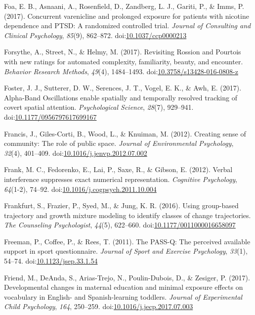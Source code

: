 \documentclass[english,man]{apa6}
\theoremstyle{definition}
\theoremstyle{definition}
\theoremstyle{definition}
\theoremstyle{remark}
\begin{document}
\hypertarget{ref-Foa2017a}{}
Foa, E. B., Asnaani, A., Rosenfield, D., Zandberg, L. J., Gariti, P., \&
Imms, P. (2017). Concurrent varenicline and prolonged exposure for
patients with nicotine dependence and PTSD: A randomized controlled
trial. \emph{Journal of Consulting and Clinical Psychology},
\emph{85}(9), 862--872.
doi:\href{https://doi.org/10.1037/ccp0000213}{10.1037/ccp0000213}

\hypertarget{ref-Forsythe2016}{}
Forsythe, A., Street, N., \& Helmy, M. (2017). Revisiting Rossion and
Pourtois with new ratings for automated complexity, familiarity, beauty,
and encounter. \emph{Behavior Research Methods}, \emph{49}(4),
1484--1493.
doi:\href{https://doi.org/10.3758/s13428-016-0808-z}{10.3758/s13428-016-0808-z}

\hypertarget{ref-Foster2017}{}
Foster, J. J., Sutterer, D. W., Serences, J. T., Vogel, E. K., \& Awh,
E. (2017). Alpha-Band Oscillations enable spatially and temporally
resolved tracking of covert spatial attention. \emph{Psychological
Science}, \emph{28}(7), 929--941.
doi:\href{https://doi.org/10.1177/0956797617699167}{10.1177/0956797617699167}

\hypertarget{ref-Francis2012}{}
Francis, J., Giles-Corti, B., Wood, L., \& Knuiman, M. (2012). Creating
sense of community: The role of public space. \emph{Journal of
Environmental Psychology}, \emph{32}(4), 401--409.
doi:\href{https://doi.org/10.1016/j.jenvp.2012.07.002}{10.1016/j.jenvp.2012.07.002}

\hypertarget{ref-Frank2012}{}
Frank, M. C., Fedorenko, E., Lai, P., Saxe, R., \& Gibson, E. (2012).
Verbal interference suppresses exact numerical representation.
\emph{Cognitive Psychology}, \emph{64}(1-2), 74--92.
doi:\href{https://doi.org/10.1016/j.cogpsych.2011.10.004}{10.1016/j.cogpsych.2011.10.004}

\hypertarget{ref-Frankfurt2016}{}
Frankfurt, S., Frazier, P., Syed, M., \& Jung, K. R. (2016). Using
group-based trajectory and growth mixture modeling to identify classes
of change trajectories. \emph{The Counseling Psychologist},
\emph{44}(5), 622--660.
doi:\href{https://doi.org/10.1177/0011000016658097}{10.1177/0011000016658097}

\hypertarget{ref-Freeman2011}{}
Freeman, P., Coffee, P., \& Rees, T. (2011). The PASS-Q: The perceived
available support in sport questionnaire. \emph{Journal of Sport and
Exercise Psychology}, \emph{33}(1), 54--74.
doi:\href{https://doi.org/10.1123/jsep.33.1.54}{10.1123/jsep.33.1.54}

\hypertarget{ref-Friend2017}{}
Friend, M., DeAnda, S., Arias-Trejo, N., Poulin-Dubois, D., \& Zesiger,
P. (2017). Developmental changes in maternal education and minimal
exposure effects on vocabulary in English- and Spanish-learning
toddlers. \emph{Journal of Experimental Child Psychology}, \emph{164},
250--259.
doi:\href{https://doi.org/10.1016/j.jecp.2017.07.003}{10.1016/j.jecp.2017.07.003}
\end{document}
